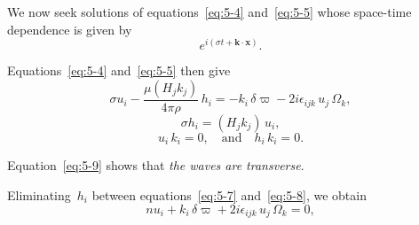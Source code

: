 We now seek solutions of equations~\eqref{eq:5-4} and~\eqref{eq:5-5}
whose space-time dependence is given by
\begin{equation}
  e^{i(\sigma t + \mathbf{k}\cdot\mathbf{x})}.
  \label{eq:5-6}
\end{equation}

Equations~\eqref{eq:5-4} and~\eqref{eq:5-5} then give
\begin{equation}
  \sigma u_i
  - \frac{\mu(H_j k_j)}{4\pi\rho}\,h_i
  = -k_i\,\delta\varpi - 2i\epsilon_{ijk}\,u_j\,\Omega_k,
  \label{eq:5-7}
\end{equation}
\begin{equation}
  \sigma h_i = (H_j k_j)\,u_i,
  \label{eq:5-8}
\end{equation}
\begin{equation}
  u_i\,k_i = 0,
  \quad\text{and}\quad
  h_i\,k_i = 0.
  \label{eq:5-9}
\end{equation}

Equation~\eqref{eq:5-9} shows that \emph{the waves are transverse}.

Eliminating~$h_i$ between equations~\eqref{eq:5-7} and~\eqref{eq:5-8},
we obtain
\begin{equation}
  n u_i + k_i\,\delta\varpi + 2i\epsilon_{ijk}\,u_j\,\Omega_k = 0,
  \label{eq:5-10}
\end{equation}
